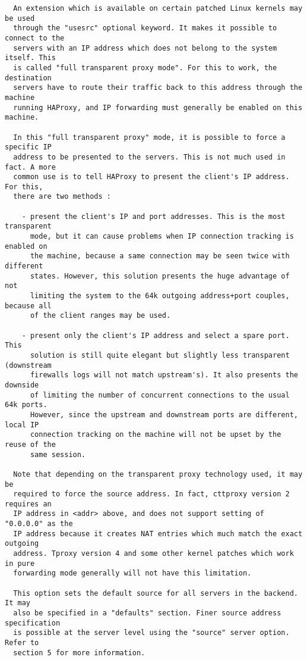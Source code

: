 \begin{verbatim}
  An extension which is available on certain patched Linux kernels may be used
  through the "usesrc" optional keyword. It makes it possible to connect to the
  servers with an IP address which does not belong to the system itself. This
  is called "full transparent proxy mode". For this to work, the destination
  servers have to route their traffic back to this address through the machine
  running HAProxy, and IP forwarding must generally be enabled on this machine.

  In this "full transparent proxy" mode, it is possible to force a specific IP
  address to be presented to the servers. This is not much used in fact. A more
  common use is to tell HAProxy to present the client's IP address. For this,
  there are two methods :

    - present the client's IP and port addresses. This is the most transparent
      mode, but it can cause problems when IP connection tracking is enabled on
      the machine, because a same connection may be seen twice with different
      states. However, this solution presents the huge advantage of not
      limiting the system to the 64k outgoing address+port couples, because all
      of the client ranges may be used.

    - present only the client's IP address and select a spare port. This
      solution is still quite elegant but slightly less transparent (downstream
      firewalls logs will not match upstream's). It also presents the downside
      of limiting the number of concurrent connections to the usual 64k ports.
      However, since the upstream and downstream ports are different, local IP
      connection tracking on the machine will not be upset by the reuse of the
      same session.

  Note that depending on the transparent proxy technology used, it may be
  required to force the source address. In fact, cttproxy version 2 requires an
  IP address in <addr> above, and does not support setting of "0.0.0.0" as the
  IP address because it creates NAT entries which much match the exact outgoing
  address. Tproxy version 4 and some other kernel patches which work in pure
  forwarding mode generally will not have this limitation.

  This option sets the default source for all servers in the backend. It may
  also be specified in a "defaults" section. Finer source address specification
  is possible at the server level using the "source" server option. Refer to
  section 5 for more information.


\end{verbatim}
